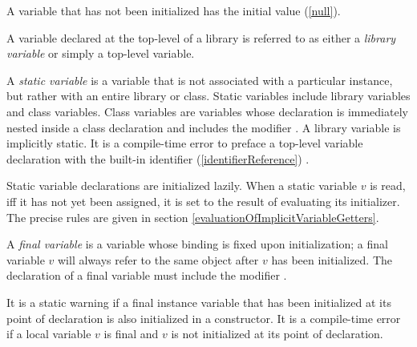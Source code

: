 \documentclass{article}
\begin{document}
\LMHash{}
A variable that has not been initialized has the initial value \NULL{} (\ref{null}).

\LMHash{}
A variable declared at the top-level of a library is referred to as either a {\em library variable} or simply a top-level variable.

\LMHash{}
A {\em static variable} is a variable that is not associated with a particular instance, but rather with an entire library or class.  Static variables include library variables and class variables. Class variables are variables whose declaration is immediately nested inside a class declaration and includes the modifier \STATIC{}. A library variable is implicitly static. It is a compile-time error to preface a top-level variable declaration with the built-in identifier  (\ref{identifierReference}) \STATIC{}.

\LMHash{}
Static variable declarations are initialized lazily. When a static variable $v$ is read, iff it has not yet been assigned,  it is set to the result of evaluating its initializer. The precise rules are given in section \ref{evaluationOfImplicitVariableGetters}.


\LMHash{}
A {\em final variable} is a variable whose binding is fixed upon initialization; a final variable $v$ will always refer to the same object after $v$ has been initialized. The declaration of a final variable must  include the modifier \FINAL{}.

\LMHash{}
It is a static warning if a final instance variable that has been initialized at its point of declaration  is  also initialized in a constructor.
It is a compile-time error if a local variable $v$ is final and $v$ is not initialized at its point of declaration.

\end{document}
